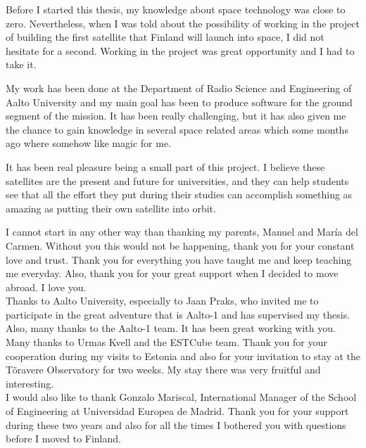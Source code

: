 
Before I started this thesis, my knowledge about space technology was close to zero. Nevertheless, when I was told about the possibility of working in the project of building the first satellite that Finland will launch into space, I did not hesitate for a second. Working in the project was great opportunity and I had to take it.

My work has been done at the Department of Radio Science and Engineering of Aalto University and my main goal has been to produce software for the ground segment of the mission. It has been really challenging, but it has also given me the chance to gain knowledge in several space related areas which some months ago where somehow like magic for me.

It has been real pleasure being a small part of this project. I believe these satellites are the present and future for universities, and they can help students see that all the effort they put during their studies can accomplish something as amazing as putting their own satellite into orbit.


\thispagestyle{plain}
\pagebreak


I cannot start in any other way than thanking my parents, Manuel and María del Carmen. Without you this would not be happening, thank you for your constant love and trust. Thank you for everything you have taught me and keep teaching me everyday. Also, thank you for your great support when I decided to move abroad. I love you.\\

Thanks to Aalto University, especially to Jaan Praks, who invited me to participate in the great adventure that is Aalto-1 and has supervised my thesis. Also, many thanks to the Aalto-1 team. It has been great working with you.\\

Many thanks to Urmas Kvell and the ESTCube team. Thank you for your cooperation during my visits to Estonia and also for your invitation to stay at the Tõravere Observatory for two weeks. My stay there was very fruitful  and interesting.\\

I would also like to thank Gonzalo Mariscal, International Manager of the School of Engineering at Universidad Europea de Madrid. Thank you for your support during these two years and also for all the times I bothered you with questions before I moved to Finland.\\

